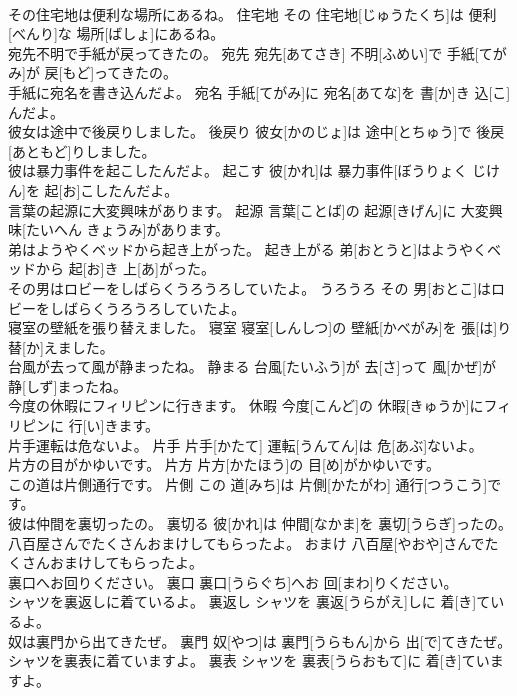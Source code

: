 \documentclass[8pt]{extreport}
\begin{document}
\begin{CJK}{UTF8}{min}
\\	その住宅地は便利な場所にあるね。	住宅地	その 住宅地[じゅうたくち]は 便利[べんり]な 場所[ばしょ]にあるね。	
\\	宛先不明で手紙が戻ってきたの。	宛先	宛先[あてさき] 不明[ふめい]で 手紙[てがみ]が 戻[もど]ってきたの。	
\\	手紙に宛名を書き込んだよ。	宛名	手紙[てがみ]に 宛名[あてな]を 書[か]き 込[こ]んだよ。	
\\	彼女は途中で後戻りしました。	後戻り	彼女[かのじょ]は 途中[とちゅう]で 後戻[あともど]りしました。	
\\	彼は暴力事件を起こしたんだよ。	起こす	彼[かれ]は 暴力事件[ぼうりょく じけん]を 起[お]こしたんだよ。	
\\	言葉の起源に大変興味があります。	起源	言葉[ことば]の 起源[きげん]に 大変興味[たいへん きょうみ]があります。	
\\	弟はようやくベッドから起き上がった。	起き上がる	弟[おとうと]はようやくベッドから 起[お]き 上[あ]がった。	
\\	その男はロビーをしばらくうろうろしていたよ。	うろうろ	その 男[おとこ]はロビーをしばらくうろうろしていたよ。	
\\	寝室の壁紙を張り替えました。	寝室	寝室[しんしつ]の 壁紙[かべがみ]を 張[は]り 替[か]えました。	
\\	台風が去って風が静まったね。	静まる	台風[たいふう]が 去[さ]って 風[かぜ]が 静[しず]まったね。	
\\	今度の休暇にフィリピンに行きます。	休暇	今度[こんど]の 休暇[きゅうか]にフィリピンに 行[い]きます。	
\\	片手運転は危ないよ。	片手	片手[かたて] 運転[うんてん]は 危[あぶ]ないよ。	
\\	片方の目がかゆいです。	片方	片方[かたほう]の 目[め]がかゆいです。	
\\	この道は片側通行です。	片側	この 道[みち]は 片側[かたがわ] 通行[つうこう]です。	
\\	彼は仲間を裏切ったの。	裏切る	彼[かれ]は 仲間[なかま]を 裏切[うらぎ]ったの。	
\\	八百屋さんでたくさんおまけしてもらったよ。	おまけ	八百屋[やおや]さんでたくさんおまけしてもらったよ。	
\\	裏口へお回りください。	裏口	裏口[うらぐち]へお 回[まわ]りください。	
\\	シャツを裏返しに着ているよ。	裏返し	シャツを 裏返[うらがえ]しに 着[き]ているよ。	
\\	奴は裏門から出てきたぜ。	裏門	奴[やつ]は 裏門[うらもん]から 出[で]てきたぜ。	
\\	シャツを裏表に着ていますよ。	裏表	シャツを 裏表[うらおもて]に 着[き]ていますよ。	

\end{CJK}
\end{document}
